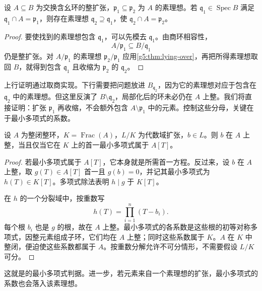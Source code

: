 \begin{theorem}[going-up]
\label{g5:thm:going-up}
	设 \(A\subseteq B\) 为交换含幺环的整扩张，\(\mathfrak p_1\subseteq\mathfrak p_2\) 为 \(A\) 的素理想。若 \(\mathfrak q_1\in\operatorname{Spec}B\) 满足 \(\mathfrak q_1\cap A=\mathfrak p_1\)，则存在素理想 \(\mathfrak q_2\supseteq\mathfrak q_1\)，使 \(\mathfrak q_2\cap A=\mathfrak p_2\)。
\end{theorem}
\begin{proof}
	要使找到的素理想包含 \(\mathfrak q_1\)，可以先模去 \(\mathfrak q_1\)。由商环相容性，
	\[
		A/\mathfrak p_1\subseteq B/\mathfrak q_1
	\]
	仍是整扩张。对 \(A/\mathfrak p_1\) 的素理想 \(\mathfrak p_2/\mathfrak p_1\) 应用\cref{g5:thm:lying-over}，再把所得素理想取回 \(B\)，就得到包含 \(\mathfrak q_1\) 且收缩为 \(\mathfrak p_2\) 的 \(\mathfrak q_2\)。
\end{proof}

上行证明通过取商实现。下行需要把问题放进 \(B_{\mathfrak q_2}\)，因为它的素理想对应于包含在 \(\mathfrak q_2\) 中的素理想。但这里反演了 \(B\setminus\mathfrak q_2\)，局部化后的环未必仍在 \(A\) 上整。我们将直接证明：扩张 \(\mathfrak p_1\) 再收缩，不会额外包含 \(A\setminus\mathfrak p_1\) 中的元素。控制这些分母，关键在于最小多项式的系数。

\begin{lemma}
\label{g5:lem:normal-minimal-polynomial}
	设 \(A\) 为整闭整环，\(K=\operatorname{Frac}(A)\)，\(L/K\) 为代数域扩张，\(b\in L\)。则 \(b\) 在 \(A\) 上整，当且仅当它在 \(K\) 上的首一最小多项式属于 \(A[T]\)。
\end{lemma}
\begin{proof}
	若最小多项式属于 \(A[T]\)，它本身就是所需首一方程。反过来，设 \(b\) 在 \(A\) 上整，取 \(g(T)\in A[T]\) 首一且 \(g(b)=0\)，并记其最小多项式为 \(h(T)\in K[T]\)。多项式除法表明 \(h\mid g\) 于 \(K[T]\)。

	在 \(h\) 的一个分裂域中，按重数写
	\[
		h(T)=\prod_{i=1}^n(T-b_i).
	\]
	每个根 \(b_i\) 也是 \(g\) 的根，故在 \(A\) 上整。最小多项式的各系数是这些根的初等对称多项式，因整元素组成子环，它们均在 \(A\) 上整；同时这些系数属于 \(K\)。\(A\) 在 \(K\) 中整闭，便迫使这些系数都属于 \(A\)。按重数分解允许不可分情形，不需要假设 \(L/K\) 可分。
\end{proof}

这就是\cite[第9节，定理9.2，第65页]{Matsumura1989}的最小多项式判据。进一步，若元素来自一个素理想的扩张，最小多项式的系数也会落入该素理想。

